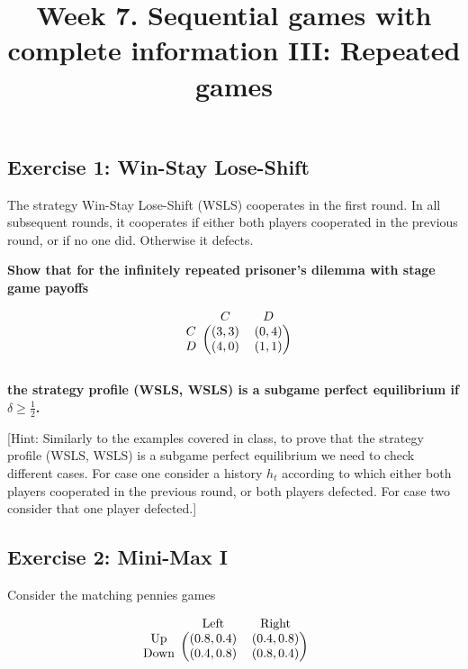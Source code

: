 \documentclass[10pt]{article}
\title{\textbf{Week 7.} Sequential games with complete information III: Repeated games}
\date{}
\begin{document}
\maketitle

\subsection*{Exercise 1: Win-Stay Lose-Shift}

The strategy Win-Stay Lose-Shift (WSLS) cooperates in the first round. In all
subsequent rounds, it cooperates if either both players cooperated in the
previous round, or if no one did. Otherwise it defects.

\textbf{Show that for the infinitely repeated prisoner's dilemma with stage game
payoffs}

\begin{equation*}
    \begin{blockarray}{ccc}
        & C & D \\
        \begin{block}{c(cc)}
            C & (3, 3) & (0, 4) \\
            D & (4, 0) & (1, 1) \\
        \end{block}
    \end{blockarray}
\end{equation*}

\textbf{the strategy profile (WSLS, WSLS) is a subgame perfect equilibrium if
\(\delta \geq \frac{1}{2}\).}

[Hint: Similarly to the examples covered in class, to prove that the strategy
profile (WSLS, WSLS) is a subgame perfect equilibrium we need to check different
cases. For case one consider a history \(h_t\) according to which either both
players cooperated in the previous round, or both players defected. For case two
consider that one player defected.]

\subsection*{Exercise 2: Mini-Max I}

Consider the matching pennies games

\begin{equation*}
    \begin{blockarray}{ccc}
        & \text{Left} & \text{Right} \\
        \begin{block}{c(cc)}
            \text{Up} &    (0.8, 0.4) & (0.4, 0.8) \\
            \text{Down} & (0.4, 0.8) & (0.8, 0.4) \\
        \end{block}
    \end{blockarray}\qquad
    \end{equation*}
\end{document}
